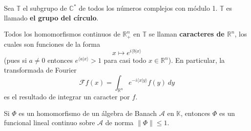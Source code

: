 \documentclass[12pt]{report}
\theoremstyle{largebreak}
\renewcommand{\leq}{\ensuremath{\leqslant}}
\newcommand\norm[1]{\ensuremath{\|#1\|}}
\newcommand\pint[2]{\ensuremath{\langle#1| #2\rangle}}
\newcommand{\fou}[1]{\ensuremath{\mathcal{F}#1}}
\begin{document}
    \begin{obs}
        Sea $\mathbb{T}$ el subgrupo de $\mathbb{C}^*$ de todos los números complejos con módulo 1. $\mathbb{T}$ es llamado \textbf{el grupo del círculo}.

        Todos los homomorfismos continuos de $\mathbb{R}^n_+$ en $\mathbb{T}$ se llaman \textbf{caracteres de $\mathbb{R}^n$}, los cuales son funciones de la forma
        \begin{equation*}
            x\mapsto e^{i\pint{b}{x}} 
        \end{equation*}
        (pues si $a\neq0$ entonces $e^{\pint{a}{x}}>1$ para casi todo $x\in\mathbb{R}^n$). En particular, la transformada de Fourier
        \begin{equation*}
            \fou{f}(x)=\int_{\mathbb{R}^n}e^{ -i\pint{x}{y}}f(y)\:dy
        \end{equation*}
        es el resultado de integrar un caracter por $f$.
    \end{obs}

    \begin{lema}
        Si $\Phi$ es un homomorfismo de un álgebra de Banach $\mathcal{A}$ en $\mathbb{K}$, entonces $\Phi$ es un funcional lineal continuo sobre $\mathcal{A}$ de norma $\norm{\Phi}\leq1$.
    \end{lema}
\end{document}
